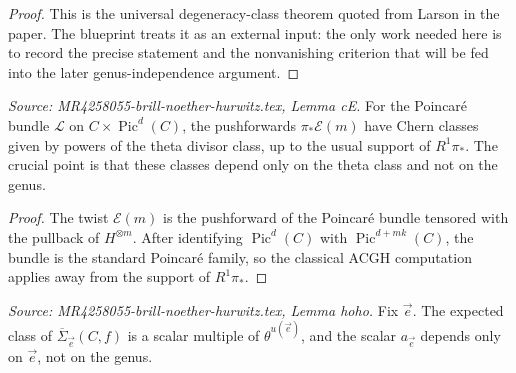 \begin{proof}
  This is the universal degeneracy-class theorem quoted from Larson in the paper. The blueprint treats it as an external input: the only work needed here is to record the precise statement and the nonvanishing criterion that will be fed into the later genus-independence argument.
\end{proof}

\begin{lemma}
  \label{lem:cE}
  \textit{Source: MR4258055-brill-noether-hurwitz.tex, Lemma cE.}
  For the Poincar\'e bundle \(\mathcal L\) on \(C\times\operatorname{Pic}^d(C)\), the pushforwards \(\pi_*\mathcal E(m)\) have Chern classes given by powers of the theta divisor class, up to the usual support of \(R^1\pi_*\). The crucial point is that these classes depend only on the theta class and not on the genus.
\end{lemma}

\begin{proof}
  The twist \(\mathcal E(m)\) is the pushforward of the Poincar\'e bundle tensored with the pullback of \(H^{\otimes m}\). After identifying \(\operatorname{Pic}^d(C)\) with \(\operatorname{Pic}^{d+mk}(C)\), the bundle is the standard Poincar\'e family, so the classical ACGH computation applies away from the support of \(R^1\pi_*\).
\end{proof}

\begin{lemma}
  \label{lem:hoho}
  \textit{Source: MR4258055-brill-noether-hurwitz.tex, Lemma hoho.}
  Fix \(\vec e\). The expected class of \(\overline{\Sigma}_{\vec e}(C,f)\) is a scalar multiple of \(\theta^{u(\vec e)}\), and the scalar \(a_{\vec e}\) depends only on \(\vec e\), not on the genus.
\end{lemma}

